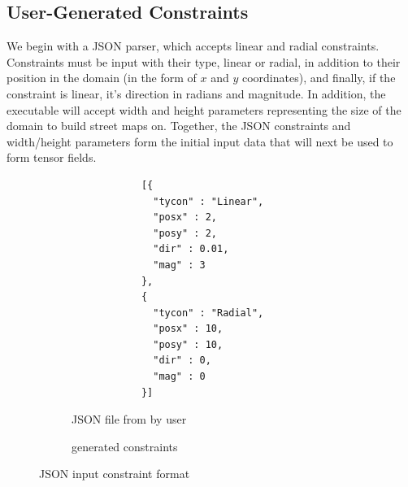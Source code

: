 \documentclass[twocolumn]{article}
\begin{document}
\subsection{User-Generated Constraints}
We begin with a JSON parser, which accepts linear and radial constraints.
Constraints must be input with their type, linear or radial, in addition to
their position in the domain (in the form of $x$ and $y$ coordinates), and
finally, if the constraint is linear, it’s direction in radians and magnitude.
In addition, the executable will accept width and height parameters
representing the size of the domain to build street maps on. Together, the JSON
constraints and width/height parameters form the initial input data that will
next be used to form tensor fields.

\begin{figure}[t!]
    \centering
    \vspace{10pt}
    \begin{subfigure}[b]{2.4in}
        \begin{verbatim}
            [{
              "tycon" : "Linear",
              "posx" : 2,
              "posy" : 2,
              "dir" : 0.01,
              "mag" : 3
            },
            {
              "tycon" : "Radial",
              "posx" : 10,
              "posy" : 10,
              "dir" : 0,
              "mag" : 0
            }]
        \end{verbatim}
        \caption{JSON file from by user}
    \end{subfigure}
    \hspace{20pt}
    \begin{subfigure}[b]{2.4in}
        \vspace{3pt}
        \caption{generated constraints}
    \end{subfigure}
    \caption{JSON input constraint format}
\label{fig:json}
\end{figure}
\end{document}
